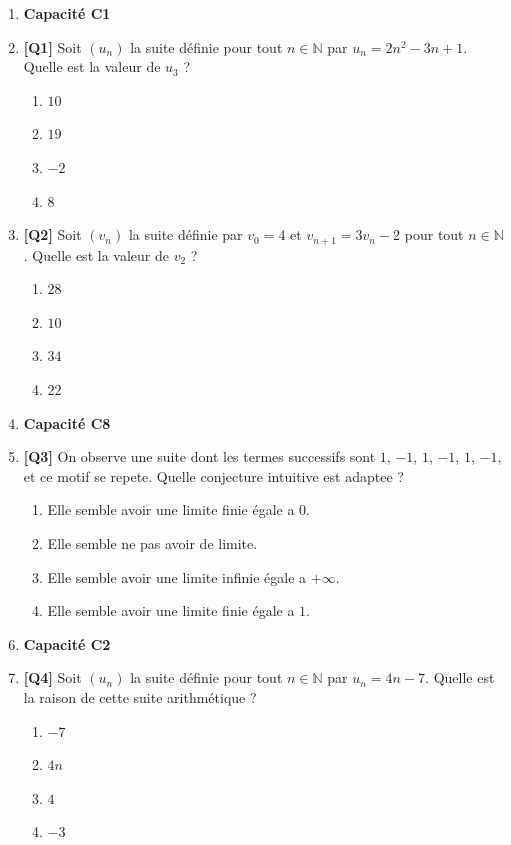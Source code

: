 \begin{enumerate}

\item[] \textbf{Capacité C1}

\item \textbf{[Q1]} Soit $(u_n)$ la suite définie pour tout $n \in \mathbb{N}$ par $u_n = 2n^2 - 3n + 1$. Quelle est la valeur de $u_3$ ?
  \begin{enumerate}[label=\Alph*.]
    \item $10$
    \item $19$
    \item $-2$
    \item $8$
  \end{enumerate}

\item \textbf{[Q2]} Soit $(v_n)$ la suite définie par $v_0 = 4$ et $v_{n+1} = 3v_n - 2$ pour tout $n \in \mathbb{N}$. Quelle est la valeur de $v_2$ ?
  \begin{enumerate}[label=\Alph*.]
    \item $28$
    \item $10$
    \item $34$
    \item $22$
  \end{enumerate}

\item[] \textbf{Capacité C8}

\item \textbf{[Q3]} On observe une suite dont les termes successifs sont $1$, $-1$, $1$, $-1$, $1$, $-1$, et ce motif se repete. Quelle conjecture intuitive est adaptee ?
  \begin{enumerate}[label=\Alph*.]
    \item Elle semble avoir une limite finie égale a $0$.
    \item Elle semble ne pas avoir de limite.
    \item Elle semble avoir une limite infinie égale a $+\infty$.
    \item Elle semble avoir une limite finie égale a $1$.
  \end{enumerate}

\item[] \textbf{Capacité C2}

\item \textbf{[Q4]} Soit $(u_n)$ la suite définie pour tout $n \in \mathbb{N}$ par $u_n = 4n - 7$. Quelle est la raison de cette suite arithmétique ?
  \begin{enumerate}[label=\Alph*.]
    \item $-7$
    \item $4n$
    \item $4$
    \item $-3$
  \end{enumerate}


\end{enumerate}
